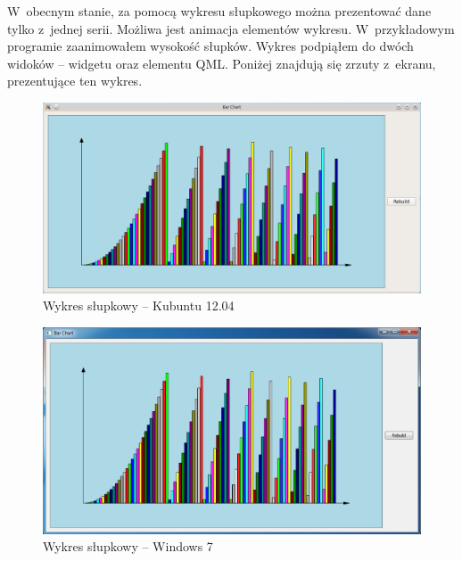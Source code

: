 W~obecnym stanie, za pomocą wykresu słupkowego można prezentować dane tylko z~jednej serii. Możliwa jest animacja elementów wykresu. W~przykładowym programie zaanimowałem wysokość słupków. Wykres podpiąłem do dwóch widoków -- widgetu oraz elementu QML. Poniżej znajdują się zrzuty z~ekranu, prezentujące ten wykres. 

\begin{figure}[H]
\centering
\includegraphics[scale=0.5]{img/BarChart_kubuntu.png}
\caption{Wykres słupkowy -- Kubuntu 12.04}\label{rys:bar:kubuntu}
\end{figure}

\begin{figure}[H]
\centering
\includegraphics[scale=0.54]{img/BarChart_windows7.png}
\caption{Wykres słupkowy -- Windows 7}\label{rys:bar:windows7}
\end{figure}



